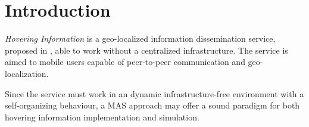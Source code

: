 \section{Introduction}
\emph{Hovering Information} is a geo-localized information dissemination
service, proposed in \cite{hover}, able to work without a centralized
infrastructure. The service is aimed to mobile users capable of peer-to-peer
communication and geo-localization.

Since the service must work in an dynamic infrastructure-free
environment with a self-organizing behaviour, a MAS approach may
offer a sound paradigm for both hovering information implementation
and simulation.
